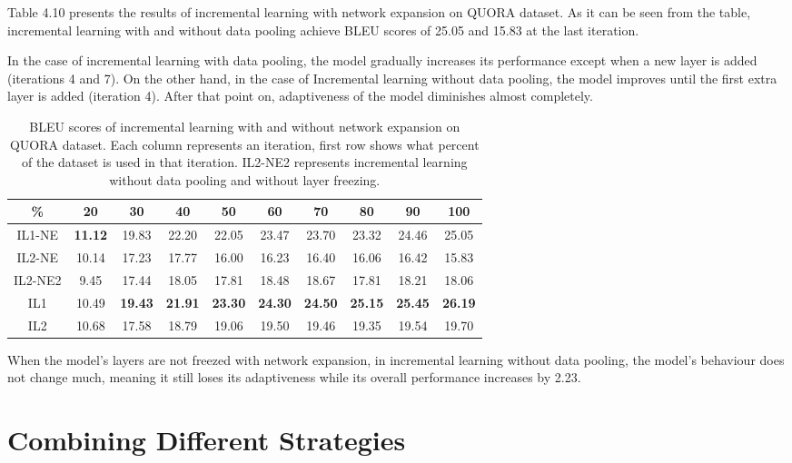 Table 4.10 presents the results of incremental learning with network expansion on QUORA dataset. As it can be seen from the table, incremental learning with and without data pooling achieve BLEU scores of 25.05 and 15.83 at the last iteration.

In the case of incremental learning with data pooling, the model gradually increases its performance except when a new layer is added (iterations 4 and 7). On the other hand, in the case of Incremental learning without data pooling, the model improves until the first extra layer is added (iteration 4). After that point on, adaptiveness of the model diminishes almost completely.

\begin{table}[t]
\centering
\small
 \begin{tabular}{|c | c | c | c | c | c | c | c | c | c |} 
 \hline
 \% & 20 & 30 & 40 & 50 & 60 & 70 & 80 & 90 & 100 \\ [0.5ex] 
 \hline
  IL1-NE & \textbf{11.12} & 19.83 & 22.20 & 22.05 & 23.47 & 23.70 & 23.32 & 24.46 & 25.05  \\ 
 \hline
  IL2-NE & 10.14 & 17.23 & 17.77 & 16.00 & 16.23 & 16.40 & 16.06 & 16.42 & 15.83 \\ 
 \hline
  IL2-NE2 & 9.45 & 17.44 & 18.05 & 17.81 & 18.48 & 18.67 & 17.81 & 18.21 & 18.06 \\ 
 \hline
  IL1 & 10.49 &  \textbf{19.43} & \textbf{21.91} &  \textbf{23.30} &  \textbf{24.30} &  \textbf{24.50} &  \textbf{25.15} &  \textbf{25.45} &  \textbf{26.19}  \\ 
 \hline
  IL2 &  10.68 & 17.58 & 18.79 & 19.06 & 19.50 & 19.46 & 19.35 & 19.54 & 19.70 \\ 
 \hline
\end{tabular}
\caption{BLEU scores of incremental learning with and without network expansion on QUORA dataset. Each column represents an iteration, first row shows what percent of the dataset is used in that iteration. IL2-NE2 represents incremental learning without data pooling and without layer freezing.}
\end{table}

When the model's layers are not freezed with network expansion, in incremental learning without data pooling, the model's behaviour does not change much, meaning it still loses its adaptiveness while its overall performance increases by 2.23.

\section{Combining Different Strategies}

